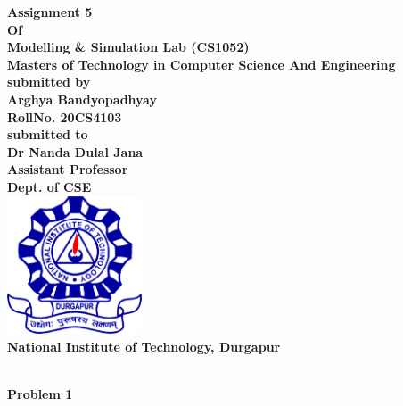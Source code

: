 \documentclass[12pt, letterpaper, twoside]{book}
\date{4nd June 2021}
\begin{document}
\begin{titlepage}
	\begin{center}
       \vspace*{5cm}
       \bfseries\Large
    	Assignment 5\\
    	Of\\
    	Modelling \& Simulation Lab (CS1052)\\
        \vskip1cm
        Masters of Technology in Computer Science And Engineering\\
        \vskip1cm
        submitted by\\
    	Arghya Bandyopadhyay\\
    	RollNo. 20CS4103\\
    	\vskip1cm
    	submitted to\\
    	Dr Nanda Dulal Jana\\
    	Assistant Professor\\
    	Dept. of CSE\\
    	\vskip1cm
    	\includegraphics[width=4cm]{NITDGP}\\
    	National Institute of Technology, Durgapur\\
    \end{center}
\end{titlepage}
\begin{center}
\textbf{\\Problem 1}
\end{center}
\end{document}
